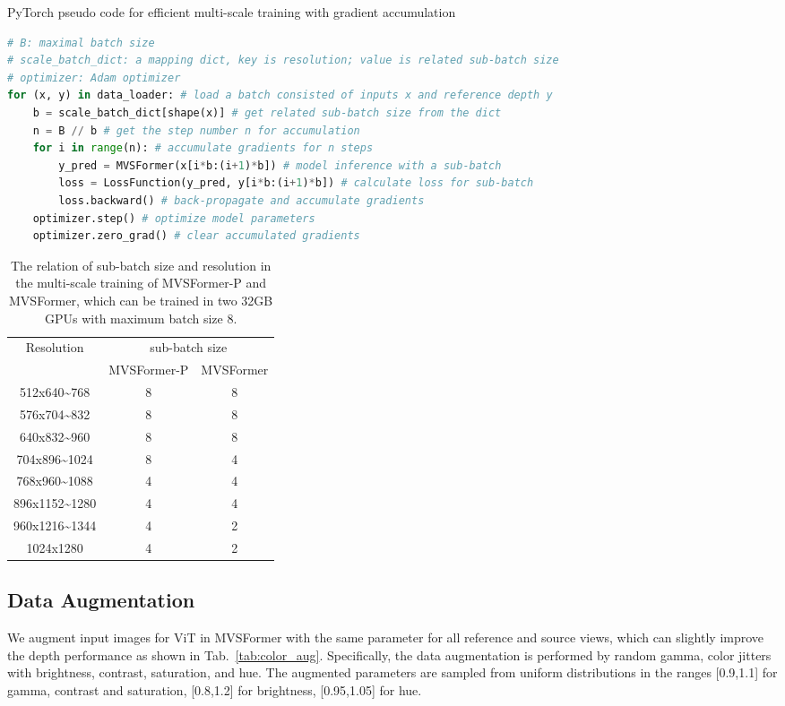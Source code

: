 \documentclass[10pt]{article} \usepackage[preprint]{tmlr}
\begin{document}
\begin{algorithm}
  \caption{PyTorch pseudo code for efficient multi-scale training with gradient accumulation}
  
  \label{alg:multi-scale}
\vspace{-0.1in}
\begin{lstlisting}[language=python]
# B: maximal batch size
# scale_batch_dict: a mapping dict, key is resolution; value is related sub-batch size
# optimizer: Adam optimizer
for (x, y) in data_loader: # load a batch consisted of inputs x and reference depth y 
    b = scale_batch_dict[shape(x)] # get related sub-batch size from the dict
    n = B // b # get the step number n for accumulation 
    for i in range(n): # accumulate gradients for n steps
        y_pred = MVSFormer(x[i*b:(i+1)*b]) # model inference with a sub-batch
        loss = LossFunction(y_pred, y[i*b:(i+1)*b]) # calculate loss for sub-batch
        loss.backward() # back-propagate and accumulate gradients
    optimizer.step() # optimize model parameters
    optimizer.zero_grad() # clear accumulated gradients
\end{lstlisting}
\vspace{-0.1in}
\end{algorithm}

\begin{table}[h]
\small
\centering
\caption{The relation of sub-batch size and resolution in the multi-scale training of MVSFormer-P and MVSFormer, which can be trained in two 32GB GPUs with maximum batch size 8.\label{tab:multi-scale}}
\begin{tabular}{c|c|c}
\hline
\multirow{2}{*}{Resolution} & \multicolumn{2}{c}{sub-batch size}\tabularnewline
\cline{2-3} \cline{3-3} 
 & MVSFormer-P & MVSFormer\tabularnewline
\hline 
512x640\textasciitilde 768 & 8 & 8\tabularnewline
576x704\textasciitilde 832 & 8 & 8\tabularnewline
640x832\textasciitilde 960 & 8 & 8\tabularnewline
704x896\textasciitilde 1024 & 8 & 4\tabularnewline
768x960\textasciitilde 1088 & 4 & 4\tabularnewline
896x1152\textasciitilde 1280 & 4 & 4\tabularnewline
960x1216\textasciitilde 1344 & 4 & 2\tabularnewline
1024x1280 & 4 & 2\tabularnewline
\hline
\end{tabular}
\end{table}

\subsection{Data Augmentation} 
We augment input images for ViT in MVSFormer with the same parameter for all reference and source views, which can slightly improve the depth performance as shown in Tab.~\ref{tab:color_aug}.
Specifically, the data augmentation is performed by random gamma, color jitters with brightness, contrast, saturation, and hue. The augmented parameters are sampled from uniform distributions in the ranges [0.9,1.1] for gamma, contrast and saturation, [0.8,1.2] for brightness, [0.95,1.05] for hue.
\end{document}
